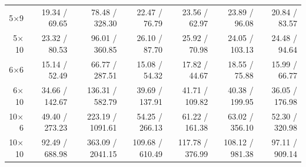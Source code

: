 \begin{table}[t]
\begin{tabular}{rrrrrrr}
5$\times$9 & 19.34 / 69.65 & 78.48 / 328.30 & 22.47 / 76.79 & 23.56 / 62.97 & 23.89 / 96.08 & 20.84 / 83.57 \\
5$\times$10 & 23.32 / 80.53 & 96.01 / 360.85 & 26.10 / 87.70 & 25.92 / 70.98 & 24.05 / 103.13 & 24.48 / 94.64 \\
6$\times$6 & 15.14 / 52.49 & 66.77 / 287.51 & 15.08 / 54.32 & 17.82 / 44.67 & 18.55 / 75.88 & 15.99 / 66.77 \\
6$\times$10 & 34.66 / 142.67 & 136.31 / 582.79 & 39.69 / 137.91 & 41.71 / 109.82 & 40.38 / 199.95 & 36.05 / 176.98 \\
10$\times$6 & 49.40 / 273.23 & 223.19 / 1091.61 & 54.25 / 266.13 & 61.22 / 161.38 & 63.02 / 356.10 & 52.30 / 320.98 \\
10$\times$10 & 92.49 / 688.98 & 363.09 / 2041.15 & 109.68 / 610.49 & 117.78 / 376.99 & 108.12 / 981.38 & 97.11 / 909.14 \\
\bottomrule
\end{tabular}
\end{table}